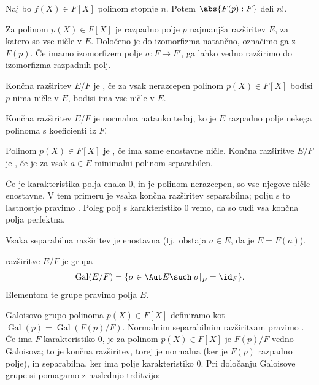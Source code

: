 \begin{trditev}
  Naj bo $f(X) \in F[X]$ polinom stopnje $n$.
  Potem $\abs{F(p):F}$ deli $n!$.
\end{trditev}


Za polinom $p(X) \in F[X]$ je razpadno polje $p$ najmanjša razširitev $E$, za
katero so vse ničle v $E$.
Določeno je do izomorfizma natančno, označimo ga z $F(p)$.
Če imamo izomorfizem polje $\sigma: F \to F'$, ga lahko vedno razširimo do
izomorfizma razpadnih polj.

\begin{definicija}
  Končna razširitev $E/F$ je , če za vsak nerazcepen polinom
  $p(X) \in F[X]$ bodisi $p$ nima ničle v $E$, bodisi ima vse ničle v $E$.
\end{definicija}

\begin{izrek}
  Končna razširitev $E/F$ je normalna natanko tedaj, ko je $E$ razpadno polje
  nekega polinoma s koeficienti iz $F$.
\end{izrek}

\begin{definicija}
  Polinom $p(X) \in F[X]$ je , če ima same enostavne ničle.
  Končna razširitve $E/F$ je , če je za vsak $a \in E$
  minimalni polinom separabilen.
\end{definicija}

Če je karakteristika polja enaka $0$, in je polinom nerazcepen, so vse njegove
ničle enostavne.
V tem primeru je vsaka končna razširitev separabilna; polju s to lastnostjo
pravimo .
Poleg polj s karakteristiko $0$ vemo, da so tudi vsa končna polja perfektna.

\begin{izrek}
  Vsaka separabilna razširitev je enostavna (tj.~obstaja $a \in E$, da je $E =
  F(a)$).
\end{izrek}


\begin{definicija}
   razširitve $E/F$ je grupa
  \[
	\operatorname{Gal}(E/F)
	= \{\sigma \in \Aut E \such \left. \sigma \right|_F = \id_F\}.
  \]
  Elementom te grupe pravimo  polja $E$.
\end{definicija}

Galoisovo grupo polinoma $p(X) \in F[X]$ definiramo kot $\operatorname{Gal}(p) =
\operatorname{Gal}(F(p)/F)$.
Normalnim separabilnim razširitvam pravimo .
Če ima $F$ karakteristiko $0$, je za polinom $p(X) \in F[X]$ je $F(p)/F$ vedno
Galoisova; to je končna razširitev, torej je normalna (ker je $F(p)$ razpadno
polje), in separabilna, ker ima polje karakteristiko $0$.
Pri določanju Galoisove grupe si pomagamo z naslednjo trditvijo:

